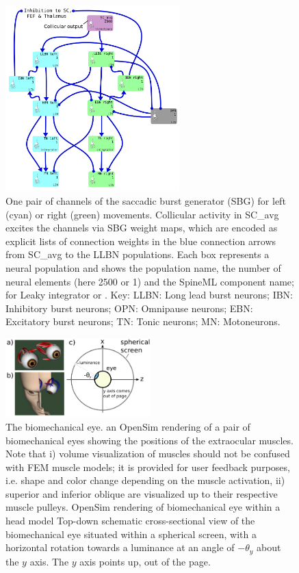 \documentclass{frontiersSCNS}
\begin{document}
\begin{figure}[!ht]
\begin{center}
\includegraphics[width=0.6\textwidth]{./figures/Brain_Stem_1channel.png}
\end{center}
\caption{ One pair of channels of the saccadic burst generator (SBG) for left
(cyan) or right (green) movements. Collicular activity in SC\_avg
excites the channels via SBG weight maps, which are encoded as
explicit lists of connection weights in the blue connection arrows
from SC\_avg to the LLBN populations. Each box represents a neural
population and shows the population name, the number of neural
elements (here 2500 or 1) and the SpineML component name;  for
Leaky integrator or . Key: LLBN: Long lead burst
neurons; IBN: Inhibitory burst neurons; OPN: Omnipause neurons; EBN:
Excitatory burst neurons; TN: Tonic neurons; MN: Motoneurons.}
\label{fig:sbg}
\end{figure}

\begin{figure}[!ht]
\begin{center}
\includegraphics[width=0.5\textwidth]{./figures/eye_screen_plus.png}
\end{center}
\caption{ The biomechanical eye.  an OpenSim rendering of a pair of
biomechanical eyes showing the positions of the extraocular
muscles. Note that i) volume visualization of muscles should not be
confused with FEM muscle models; it is provided for user feedback
purposes, i.e. shape and color change depending on the muscle
activation, ii) superior and inferior oblique are visualized up to
their respective muscle pulleys.  OpenSim rendering of biomechanical
eye within a head model  Top-down schematic cross-sectional view of
the biomechanical eye situated within a spherical screen, with a
horizontal rotation towards a luminance at an angle of $-\theta_{y}$
about the $y$ axis. The $y$ axis points up, out of the page.}
\label{fig:bioeye}
\end{figure}
\end{document}

